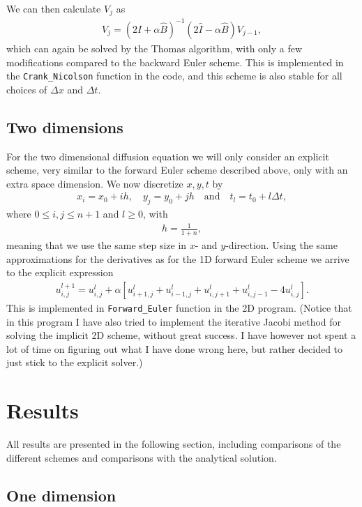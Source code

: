 \documentclass[12pt, a4paper]{article}
\begin{document}
We can then calculate $V_j$ as 
\begin{align*}
V_j =  (2\hat{I} + \alpha \hat{B})^{-1} (2\hat{I} - \alpha \hat{B})V_{j-1}, 
\end{align*}
which can again be solved by the Thomas algorithm, with only a few modifications compared to the  
backward Euler scheme. This is implemented in the \texttt{Crank\_Nicolson} function in the code, and this 
scheme is also stable for all choices of $\Delta x$ and $\Delta t$. 

\subsection{Two dimensions}

For the two dimensional diffusion equation we will only consider an explicit scheme, very similar to 
the forward Euler scheme described above, only with an extra space dimension. We now discretize 
$x,y,t$ by 
\begin{align*}
x_i = x_0 + ih, \quad y_j = y_0 + jh \quad\text{and} \quad t_l = t_0 + l\Delta t,  
\end{align*}
where $0\leq i,j\leq n+1$ and $l\geq 0$, with 
\begin{align*}
h = \frac{1}{1+n}, 
\end{align*}
meaning that we use the same step size in $x$- and $y$-direction. Using the same approximations for the 
derivatives as for the 1D forward Euler scheme we arrive to the explicit expression 
\begin{align*}
u_{i,j}^{l+1} = u_{i,j}^l + \alpha \left[ u_{i+1,j}^l + u_{i-1,j}^l + u_{i,j+1}^l + u_{i,j-1}^l
				-4 u_{i,j}^l  \right]. 
\end{align*}
This is implemented in \texttt{Forward\_Euler} function in the 2D program. (Notice that in this program 
I have also tried to implement the iterative Jacobi method for solving the implicit 2D scheme, without 
great success. I have however not spent a lot of time on figuring out what I have done wrong here, but 
rather decided to just stick to the explicit solver.)  

\section{Results}

All results are presented in the following section, including comparisons of the different schemes and 
comparisons with the analytical solution. 

\subsection{One dimension}
\end{document}

